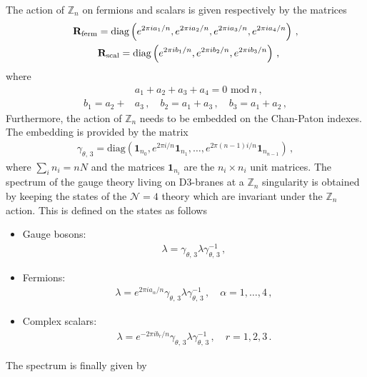 \documentclass[12pt,a4paper]{book}
\begin{document}
The action of $\mathbb{Z}_n$ on fermions and scalars is given respectively by the matrices
\begin{align}
\label{eq:ZnAction}
\mathbf{R}_{\rm ferm}& = \text{diag} \left(e^{2 \pi i a_1/n}, e^{2 \pi i a_2/n}, e^{2 \pi i a_3/n}, e^{2 \pi i a_4/n}\right) \,, \nonumber\\
&\mathbf{R}_{\rm scal} = \text{diag} \left(e^{2 \pi i b_1/n}, e^{2 \pi i b_2/n}, e^{2 \pi i b_3/n}\right) \,,
\end{align}
where
\begin{align}
\label{eq:ZnActionConstraints}
&a_1 + a_2 + a_3 + a_4 = 0 \,\, \text{mod}\, n\,, \nonumber\\
b_1 = a_2 +& a_3 \,, \quad b_2 = a_1 + a_3 \,, \quad b_3 = a_1 + a_2 \,,
\end{align}
Furthermore, the action of $\mathbb{Z}_n$ needs to be embedded on the Chan-Paton indexes. The embedding is provided by the matrix
\begin{align}
\label{eq:ZnActionChanPaton}
\gamma_{\theta,\,3} = \text{diag} \left(\mathbf{1}_{n_0}, e^{2 \pi i/n} \mathbf{1}_{n_1}, \dots, e^{2 \pi (n - 1) i/n} \mathbf{1}_{n_{n-1}}\right)\,,
\end{align}
where $\sum_i n_i = n N$ and the matrices $\mathbf{1}_{n_i}$ are the $n_i \times n_i$ unit matrices. The spectrum of the gauge theory living on D3-branes at a $\mathbb{Z}_n$ singularity is obtained by keeping the states of the $\mathcal{N} = 4$ theory which are invariant under the $\mathbb{Z}_n$ action. This is defined on the states as follows
\begin{itemize}
\item Gauge bosons:
\begin{align}
\label{eq:ZnProjectionBosons}
\lambda = \gamma_{\theta,\,3} \lambda \gamma_{\theta,\,3}^{-1} \,,
\end{align}
\item Fermions:
\begin{align}
\label{eq:ZnProjectionFermions}
\lambda = e^{2 \pi i a_\alpha/n} \gamma_{\theta,\,3} \lambda \gamma_{\theta,\,3}^{-1} \,, \quad \alpha = 1, \dots, 4\,,
\end{align}
\item Complex scalars:
\begin{align}
\label{eq:ZnProjectionScalars}
\lambda = e^{-2 \pi i b_r/n} \gamma_{\theta,\,3} \lambda \gamma_{\theta,\,3}^{-1} \,, \quad r = 1,2,3 \,.
\end{align}
\end{itemize}
The spectrum is finally given by
\end{document}
